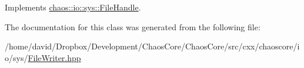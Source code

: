 Implements \hyperlink{classchaos_1_1io_1_1sys_1_1_file_handle_aaab721e850f11cd1f1bf3dba8e4ab2a1}{chaos\-::io\-::sys\-::\-File\-Handle}.



The documentation for this class was generated from the following file\-:\begin{DoxyCompactItemize}
\item 
/home/david/\-Dropbox/\-Development/\-Chaos\-Core/\-Chaos\-Core/src/cxx/chaoscore/io/sys/\hyperlink{_file_writer_8hpp}{File\-Writer.\-hpp}\end{DoxyCompactItemize}
